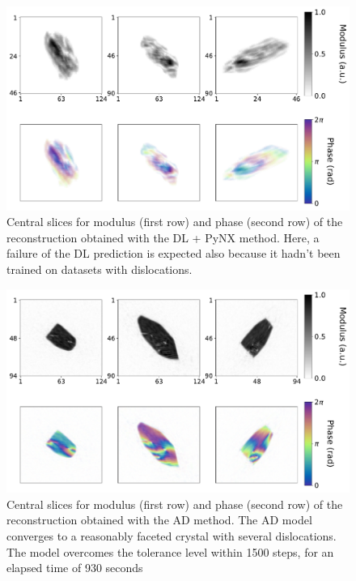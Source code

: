 \begin{figure}[H]
  \centering
  \includegraphics[width=\textwidth]{figures/AD/dl_pynx_mouad.pdf}
  \caption{Central slices for modulus (first row) and phase (second row) of the reconstruction obtained with the DL + PyNX 
  method. Here, a failure of the DL prediction is expected also because it hadn't been trained on datasets with dislocations. }
  \label{fig:dl_pynx_mouad}
\end{figure}

\begin{figure}[H]
  \centering
  \includegraphics[width=\textwidth]{figures/AD/ad_mouad.pdf}
  \caption{Central slices for modulus (first row) and phase (second row) of the reconstruction obtained with the AD method.
  The AD model converges to a reasonably faceted crystal with several dislocations. The model overcomes the tolerance level 
  within 1500 steps, for an elapsed time of 930 seconds}
  \label{fig:ad_mouad}
\end{figure}

